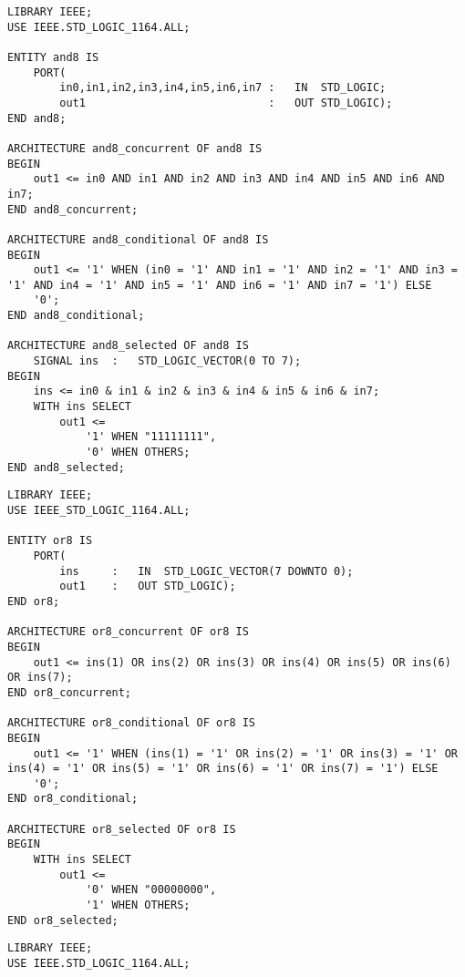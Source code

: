 \begin{enumerate}
	\begin{minipage}{1\linewidth}
		\item
		\begin{lstlisting}
LIBRARY IEEE;
USE IEEE.STD_LOGIC_1164.ALL;

ENTITY and8 IS
	PORT(
		in0,in1,in2,in3,in4,in5,in6,in7	:	IN	STD_LOGIC;
		out1							:	OUT	STD_LOGIC);
END and8;

ARCHITECTURE and8_concurrent OF and8 IS
BEGIN
	out1 <= in0 AND in1 AND in2 AND in3 AND in4 AND in5 AND in6 AND in7;
END and8_concurrent;

ARCHITECTURE and8_conditional OF and8 IS
BEGIN
	out1 <= '1' WHEN (in0 = '1' AND in1 = '1' AND in2 = '1' AND in3 = '1' AND in4 = '1' AND in5 = '1' AND in6 = '1' AND in7 = '1') ELSE
	'0';
END and8_conditional;

ARCHITECTURE and8_selected OF and8 IS
	SIGNAL ins	:	STD_LOGIC_VECTOR(0 TO 7);
BEGIN
	ins <= in0 & in1 & in2 & in3 & in4 & in5 & in6 & in7;
	WITH ins SELECT
		out1 <=
			'1' WHEN "11111111",
			'0' WHEN OTHERS;
END and8_selected;
		\end{lstlisting}
	\end{minipage}

	\begin{minipage}{1\linewidth}
		\item
		\begin{lstlisting}
LIBRARY IEEE;
USE IEEE_STD_LOGIC_1164.ALL;

ENTITY or8 IS
	PORT(
		ins		:	IN	STD_LOGIC_VECTOR(7 DOWNTO 0);
		out1	:	OUT	STD_LOGIC);
END or8;

ARCHITECTURE or8_concurrent OF or8 IS
BEGIN
	out1 <= ins(1) OR ins(2) OR ins(3) OR ins(4) OR ins(5) OR ins(6) OR ins(7);
END or8_concurrent;

ARCHITECTURE or8_conditional OF or8 IS
BEGIN
	out1 <= '1' WHEN (ins(1) = '1' OR ins(2) = '1' OR ins(3) = '1' OR ins(4) = '1' OR ins(5) = '1' OR ins(6) = '1' OR ins(7) = '1') ELSE
	'0';
END or8_conditional;

ARCHITECTURE or8_selected OF or8 IS
BEGIN
	WITH ins SELECT
		out1 <=
			'0' WHEN "00000000",
			'1' WHEN OTHERS;
END or8_selected;
		\end{lstlisting}
	\end{minipage}

	\begin{minipage}{1\linewidth}
		\item 
		\begin{lstlisting}
LIBRARY IEEE;
USE IEEE.STD_LOGIC_1164.ALL;


\end{lstlisting}
\end{minipage}
\end{enumerate}
